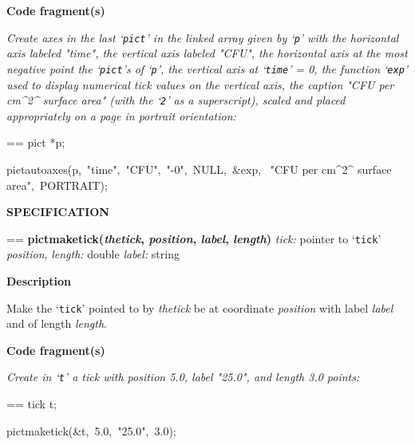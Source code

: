 \documentclass{book}
\makeatletter
\newcommand\Texinfocommandstyletextvar[1]{{\normalfont{}\textsl{#1}}}%
\newenvironment{Texinfopreformatted}{%
  \par\GNUTobeylines\obeyspaces\frenchspacing\parskip=\z@\parindent=\z@}{}
{\catcode`\^^M=13 \gdef\GNUTobeylines{\catcode`\^^M=13 \def^^M{\null\par}}}
\newenvironment{Texinfoindented}{\begin{list}{}{}\item\relax}{\end{list}}
\renewcommand{\_}{\Texinfounderscore\discretionary{}{}{}}
\makeatother
\begin{document}
\noindent{}\textbf{Code fragment(s)}

\emph{Create axes in the last `\texttt{pict}' in the linked array
given by `\texttt{p}' with the horizontal axis labeled "time",
the vertical axis labeled "CFU", the horizontal axis at the most
negative point the `\texttt{pict}'s of `\texttt{p}',
the vertical axis at `\texttt{time}' = 0, the function
`\texttt{exp}' used to display numerical tick values on the vertical axis,
the caption "CFU per cm\^{}2\^{} surface area" (with the `\texttt{2}' as a
superscript), scaled and placed appropriately on a page in portrait orientation:}
\begin{Texinfoindented}
\begin{Texinfopreformatted}%
\ttfamily pict *p;

pict\_autoaxes(p,\ "time",\ "CFU",\ "-0",\ NULL,\ \&exp,
\                            "CFU per cm\^{}2\^{} surface area",\ PORTRAIT);
\end{Texinfopreformatted}
\end{Texinfoindented}

\noindent{}\textbf{SPECIFICATION}
\begin{Texinfoindented}
\begin{Texinfopreformatted}%
\textbf{pict\_maketick(\Texinfocommandstyletextvar{thetick}, \Texinfocommandstyletextvar{position}, \Texinfocommandstyletextvar{label}, \Texinfocommandstyletextvar{length})}
\Texinfocommandstyletextvar{tick:} pointer to `\texttt{tick}'
\Texinfocommandstyletextvar{position}, \Texinfocommandstyletextvar{length:} double
\Texinfocommandstyletextvar{label:} string
\end{Texinfopreformatted}
\end{Texinfoindented}
%
%

\noindent{}\textbf{Description}

Make the `\texttt{tick}' pointed to by \Texinfocommandstyletextvar{thetick} be at coordinate \Texinfocommandstyletextvar{position}
with label \Texinfocommandstyletextvar{label} and of length \Texinfocommandstyletextvar{length}.

\noindent{}\textbf{Code fragment(s)}

\emph{Create in `\texttt{t}' a tick with position 5.0, label "25.0", and length
3.0 points:}
\begin{Texinfoindented}
\begin{Texinfopreformatted}%
\ttfamily tick t;

pict\_maketick(\&t,\ 5.0,\ "25.0",\ 3.0);
\end{Texinfopreformatted}
\end{Texinfoindented}
\end{document}
